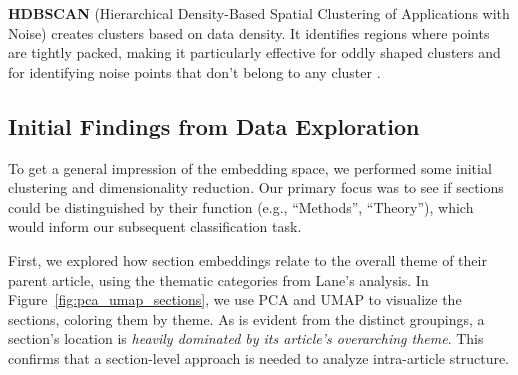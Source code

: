 \textbf{HDBSCAN} (Hierarchical Density-Based Spatial Clustering of Applications
with Noise) creates clusters based on data density. It identifies regions where
points are tightly packed, making it particularly effective for oddly shaped
clusters and for identifying noise points that don't belong to any cluster
\autocite{Stewart2022Implementation}.

\subsection{Initial Findings from Data Exploration}

To get a general impression of the embedding space, we performed some initial
clustering and dimensionality reduction. Our primary focus was to see if
sections could be distinguished by their function (e.g., ``Methods'',
``Theory''), which would inform our subsequent classification task.

First, we explored how section embeddings relate to the overall theme of their
parent article, using the thematic categories from Lane's analysis. In
Figure~\ref{fig:pca_umap_sections}, we use PCA and UMAP to visualize the
sections, coloring them by theme. As is evident from the distinct groupings, a
section’s location is \emph{heavily dominated by its article's overarching
theme}. This confirms that a section-level approach is needed to analyze
intra-article structure.

